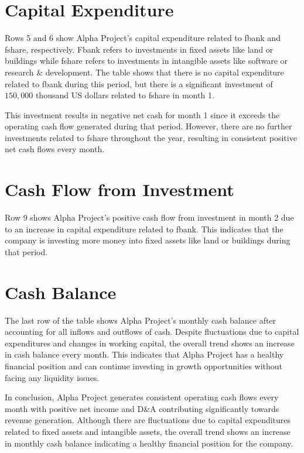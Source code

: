 \section{Capital Expenditure}

Rows 5 and 6 show Alpha Project's capital expenditure related to fbank and fshare, respectively. Fbank refers to investments in fixed assets like land or buildings while fshare refers to investments in intangible assets like software or research & development. The table shows that there is no capital expenditure related to fbank during this period, but there is a significant investment of $150,000$ thousand US dollars related to fshare in month 1.

This investment results in negative net cash for month 1 since it exceeds the operating cash flow generated during that period. However, there are no further investments related to fshare throughout the year, resulting in consistent positive net cash flows every month.

\section{Cash Flow from Investment}

Row 9 shows Alpha Project's positive cash flow from investment in month 2 due to an increase in capital expenditure related to fbank. This indicates that the company is investing more money into fixed assets like land or buildings during that period.

\section{Cash Balance}

The last row of the table shows Alpha Project's monthly cash balance after accounting for all inflows and outflows of cash. Despite fluctuations due to capital expenditures and changes in working capital, the overall trend shows an increase in cash balance every month. This indicates that Alpha Project has a healthy financial position and can continue investing in growth opportunities without facing any liquidity issues.

In conclusion, Alpha Project generates consistent operating cash flows every month with positive net income and D&A contributing significantly towards revenue generation. Although there are fluctuations due to capital expenditures related to fixed assets and intangible assets, the overall trend shows an increase in monthly cash balance indicating a healthy financial position for the company.